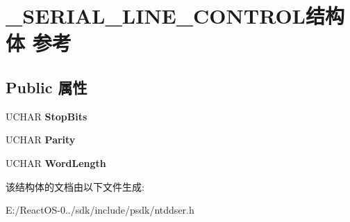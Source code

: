 \hypertarget{struct___s_e_r_i_a_l___l_i_n_e___c_o_n_t_r_o_l}{}\section{\+\_\+\+S\+E\+R\+I\+A\+L\+\_\+\+L\+I\+N\+E\+\_\+\+C\+O\+N\+T\+R\+O\+L结构体 参考}
\label{struct___s_e_r_i_a_l___l_i_n_e___c_o_n_t_r_o_l}
\subsection*{Public 属性}
\begin{DoxyCompactItemize}
\item 
\mbox{\label{struct___s_e_r_i_a_l___l_i_n_e___c_o_n_t_r_o_l_a0f1a4213d8c9eeb5896c6b0f3bf929e9}} 
U\+C\+H\+AR {\bfseries Stop\+Bits}
\item 
\mbox{\label{struct___s_e_r_i_a_l___l_i_n_e___c_o_n_t_r_o_l_ab0cf6e57a7a0ae3839f6560d5af37453}} 
U\+C\+H\+AR {\bfseries Parity}
\item 
\mbox{\label{struct___s_e_r_i_a_l___l_i_n_e___c_o_n_t_r_o_l_a9a6a8e9be246582f9f4b192bd217abfa}} 
U\+C\+H\+AR {\bfseries Word\+Length}
\end{DoxyCompactItemize}


该结构体的文档由以下文件生成\+:\begin{DoxyCompactItemize}
\item 
E\+:/\+React\+O\+S-\/0../sdk/include/psdk/ntddser.\+h\end{DoxyCompactItemize}
